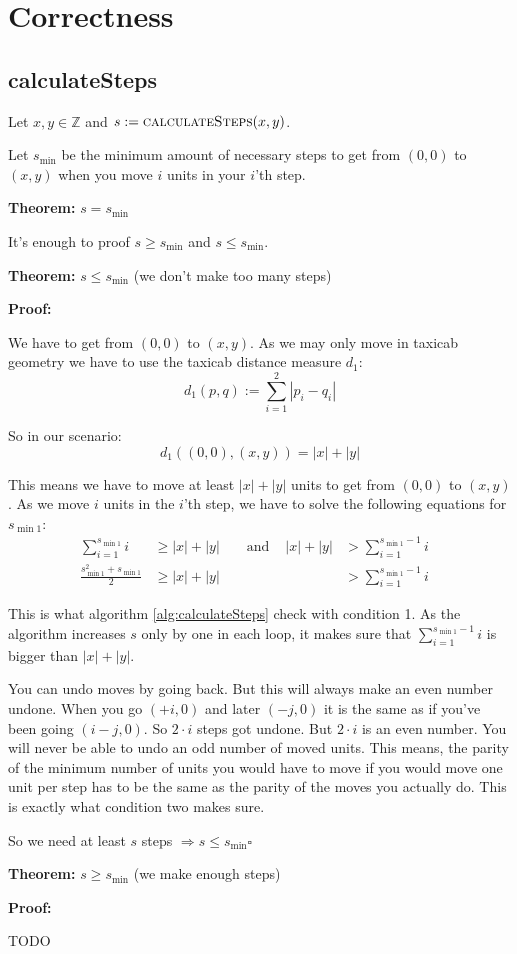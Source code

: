 \documentclass[a4paper]{scrartcl}
\newenvironment{myindentpar}[1]%
 {\begin{list}{}%
         {\setlength{\leftmargin}{#1}}%
         \item[]%
 }
 {\end{list}}
\begin{document}
\section{Correctness}
\subsection{calculateSteps}
Let $x,y \in \mathbb{Z}$ and $s := \Call{calculateSteps}{x, y}$.

Let $s_{\min}$ be the minimum amount of necessary steps to get from $(0,0)$
to $(x,y)$ when you move $i$ units in your $i$'th step.

\textbf{Theorem: } $s = s_{\min}$

It's enough to proof $s \geq s_{\min}$ and $s \leq s_{\min}$.

\begin{myindentpar}{1cm}
\textbf{Theorem: } $s \leq s_{\min}$ (we don't make too many steps)

\textbf{Proof: } 
\begin{myindentpar}{1cm}
We have to get from $(0,0)$ to $(x, y)$. As we may only move in
taxicab geometry we have to use the taxicab distance measure $d_1$:
\[d_1 \left (p, q \right ) := \sum_{i=1}^2 |p_i -q_i|\]

So in our scenario:
\[d_1 \left ((0,0), (x,y) \right ) = |x| + |y|\]

This means we have to move at least $|x| + |y|$ units to get 
from $(0,0)$ to $(x, y)$. As we move $i$ units in the $i$'th step,
we have to solve the following equations for $s_{\min1}$:
\begin{align}
    \sum_{i=1}^{s_{\min1}} i          &\geq |x| + |y| &&\text{ and } &|x| + |y|      &> \sum_{i=1}^{s_{\min1} - 1} i\\
    \frac{s_{\min1}^2 + s_{\min1}}{2} &\geq |x| + |y| &&             &               &> \sum_{i=1}^{s_{\min1} - 1} i & 
\end{align}

This is what algorithm \ref{alg:calculateSteps} check with condition 1. 
As the algorithm increases $s$ only by one in each loop, it makes 
sure that $\sum_{i=1}^{s_{\min1} - 1} i$ is bigger than $|x| + |y|$.

You can undo moves by going back. But this will always make an even
number undone. When you go $(+i, 0)$ and later $(-j, 0)$ it is the 
same as if you've been going $(i-j, 0)$. So $2\cdot i$ steps got undone.
But $2\cdot i$ is an even number. You will never be able to undo
an odd number of moved units. This means, the parity of the minimum 
number of units you would have to move if you would move one unit per
step has to be the same as the parity of the moves you actually do.
This is exactly what condition two makes sure.

So we need at least $s$ steps $\Rightarrow s \leq s_{\min} \square$
\end{myindentpar}

\textbf{Theorem: } $s \geq s_{\min}$ (we make enough steps)

\textbf{Proof: } 
\begin{myindentpar}{1cm}
TODO
\end{myindentpar}
\end{myindentpar}
\end{document}
